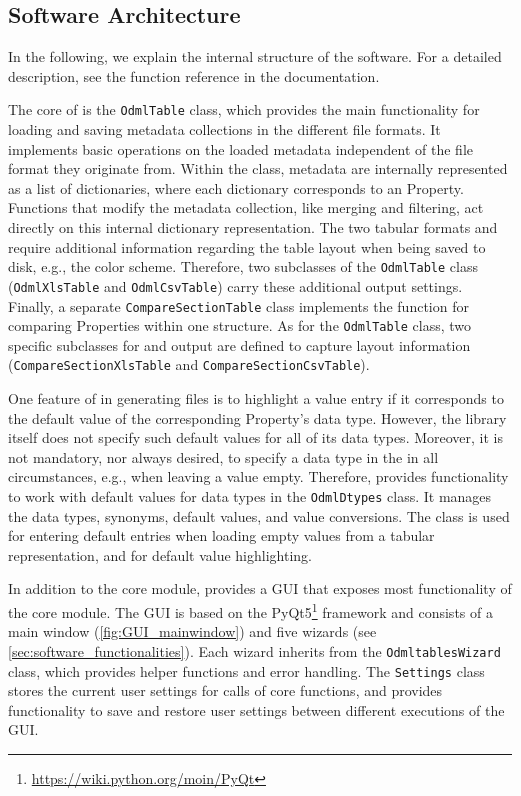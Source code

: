 \subsection{Software Architecture}
\label{sub:Software-Architecture}

In the following, we explain the internal structure of the  software. For a detailed description, see the function reference in the  documentation.

The core of  is the \texttt{OdmlTable} class, which provides the main functionality for loading and saving metadata collections in the different file formats. It implements basic operations on the loaded metadata independent of the file format they originate from. Within the class, metadata are internally represented as a list of dictionaries, where each dictionary corresponds to an  Property. Functions that modify the metadata collection, like merging and filtering, act directly on this internal dictionary representation. The two tabular formats  and  require additional information regarding the table layout when being saved to disk, e.g., the color scheme. Therefore, two subclasses of the \texttt{OdmlTable} class (\texttt{OdmlXlsTable} and \texttt{OdmlCsvTable}) carry these additional output settings. Finally, a separate \texttt{CompareSectionTable} class implements the function for comparing Properties within one  structure. As for the \texttt{OdmlTable} class, two specific subclasses for  and  output are defined to capture layout information (\texttt{CompareSectionXlsTable} and \texttt{CompareSectionCsvTable}).

One feature of  in generating  files is to highlight a value entry if it corresponds to the default value of the corresponding Property's data type. However, the  library itself does not specify such default values for all of its data types. Moreover, it is not mandatory, nor always desired, to specify a data type in the  in all circumstances, e.g., when leaving a value empty. Therefore,  provides functionality to work with default values for data types in the \texttt{OdmlDtypes} class. It manages the data types, synonyms, default values, and value conversions. The class is used for entering default entries when loading empty values from a tabular representation, and for default value highlighting.

In addition to the core module,  provides a GUI that exposes most functionality of the core module. The GUI is based on the PyQt5\footnote{\url{https://wiki.python.org/moin/PyQt}} framework and consists of a main window (\cref{fig:GUI_mainwindow}) and five wizards (see \cref{sec:software_functionalities}). Each wizard inherits from the \texttt{OdmltablesWizard} class, which provides helper functions and error handling. The \texttt{Settings} class stores the current user settings for calls of  core functions, and provides functionality to save and restore user settings between different executions of the GUI.



